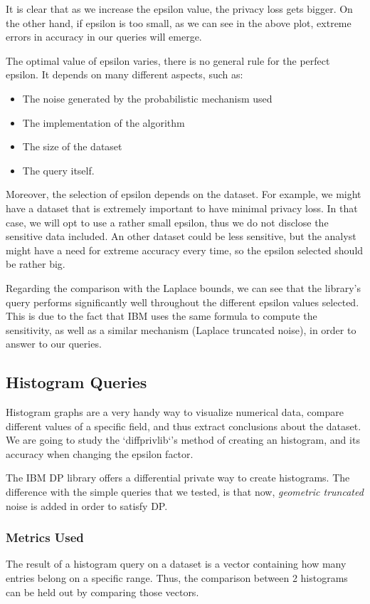 It is clear that as we increase the epsilon value, the privacy loss gets bigger. On the other hand, if epsilon is too small, as we can see in the above plot, extreme errors in accuracy in our queries will emerge. 

The optimal value of epsilon varies, there is no general rule for the perfect epsilon. It depends on many different aspects, such as:

\begin{itemize}
    \item The noise generated by the probabilistic mechanism used
    \item The implementation of the algorithm
    \item The size of the dataset
    \item The query itself.
\end{itemize}

Moreover, the selection of epsilon depends on the dataset. For example, we might have a dataset that is extremely important to have minimal privacy loss. In that case, we will opt to use a rather small epsilon, thus we do not disclose the sensitive data included. An other dataset could be less sensitive, but the analyst might have a need for extreme accuracy every time, so the epsilon selected should be rather big.

Regarding the comparison with the Laplace bounds, we can see that the library's query performs significantly well throughout the different epsilon values selected. This is due to the fact that IBM uses the same formula to compute the sensitivity, as well as a similar mechanism (Laplace truncated noise), in order to answer to our queries.

\subsection{Histogram Queries}

Histogram graphs are a very handy way to visualize numerical data, compare different values of a specific field, and thus extract conclusions about the dataset. We are going to study the `diffprivlib`'s method of creating an histogram, and its accuracy when changing the epsilon factor.

The IBM DP library offers a differential private way to create histograms. The difference with the simple queries that we tested, is that now, \emph{geometric truncated} noise is added in order to satisfy DP.

\subsubsection{Metrics Used}
The result of a histogram query on a dataset is a vector containing how many entries belong on a specific range. Thus, the comparison between 2 histograms can be held out by comparing those vectors. 

